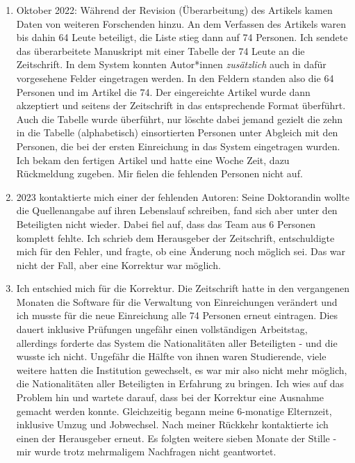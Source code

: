 \documentclass[
  letterpaper,
  DIV=11,
  numbers=noendperiod]{scrreprt}
\begin{document}
\begin{tcolorbox}
\begin{enumerate}
\def\labelenumi{\arabic{enumi}.}
\item
  Oktober 2022: Während der Revision (Überarbeitung) des Artikels kamen
  Daten von weiteren Forschenden hinzu. An dem Verfassen des Artikels
  waren bis dahin 64 Leute beteiligt, die Liste stieg dann auf 74
  Personen. Ich sendete das überarbeitete Manuskript mit einer Tabelle
  der 74 Leute an die Zeitschrift. In dem System konnten Autor*innen
  \emph{zusätzlich} auch in dafür vorgesehene Felder eingetragen werden.
  In den Feldern standen also die 64 Personen und im Artikel die 74. Der
  eingereichte Artikel wurde dann akzeptiert und seitens der Zeitschrift
  in das entsprechende Format überführt. Auch die Tabelle wurde
  überführt, nur löschte dabei jemand gezielt die zehn in die Tabelle
  (alphabetisch) einsortierten Personen unter Abgleich mit den Personen,
  die bei der ersten Einreichung in das System eingetragen wurden. Ich
  bekam den fertigen Artikel und hatte eine Woche Zeit, dazu Rückmeldung
  zugeben. Mir fielen die fehlenden Personen nicht auf.
\item
  2023 kontaktierte mich einer der fehlenden Autoren: Seine Doktorandin
  wollte die Quellenangabe auf ihren Lebenslauf schreiben, fand sich
  aber unter den Beteiligten nicht wieder. Dabei fiel auf, dass das Team
  aus 6 Personen komplett fehlte. Ich schrieb dem Herausgeber der
  Zeitschrift, entschuldigte mich für den Fehler, und fragte, ob eine
  Änderung noch möglich sei. Das war nicht der Fall, aber eine Korrektur
  war möglich.
\item
  Ich entschied mich für die Korrektur. Die Zeitschrift hatte in den
  vergangenen Monaten die Software für die Verwaltung von Einreichungen
  verändert und ich musste für die neue Einreichung alle 74 Personen
  erneut eintragen. Dies dauert inklusive Prüfungen ungefähr einen
  vollständigen Arbeitstag, allerdings forderte das System die
  Nationalitäten aller Beteiligten - und die wusste ich nicht. Ungefähr
  die Hälfte von ihnen waren Studierende, viele weitere hatten die
  Institution gewechselt, es war mir also nicht mehr möglich, die
  Nationalitäten aller Beteiligten in Erfahrung zu bringen. Ich wies auf
  das Problem hin und wartete darauf, dass bei der Korrektur eine
  Ausnahme gemacht werden konnte. Gleichzeitig begann meine 6-monatige
  Elternzeit, inklusive Umzug und Jobwechsel. Nach meiner Rückkehr
  kontaktierte ich einen der Herausgeber erneut. Es folgten weitere
  sieben Monate der Stille - mir wurde trotz mehrmaligem Nachfragen
  nicht geantwortet.

\end{enumerate}
\end{tcolorbox}
\end{document}
